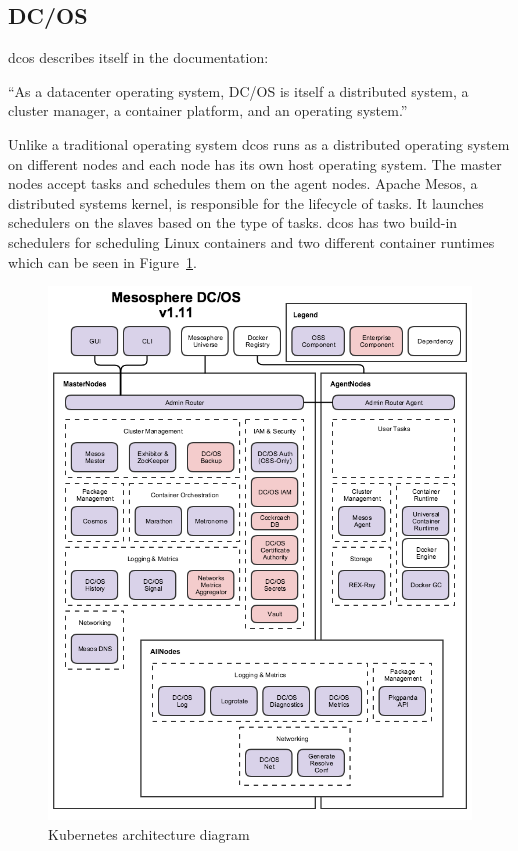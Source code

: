 \subsection{DC/OS}
\label{subsec:dcos}
\Gls{dcos} describes itself in the documentation\cite{dcos_what}: 
\begin{displayquote}
``As a datacenter operating system, DC/OS is itself a distributed system, a cluster manager, a container platform, and an operating system.''
\end{displayquote} 
Unlike a traditional operating system \gls{dcos} runs as a distributed operating system on different nodes and each node has its own host operating system. The master nodes accept tasks and schedules them on the agent nodes. Apache Mesos\cite{apache_mesos}, a distributed systems kernel, is responsible for the lifecycle of tasks. It launches schedulers on the slaves based on the type of tasks. \Gls{dcos} has two build-in schedulers for scheduling Linux containers and two different container runtimes which can be seen in Figure~\ref{fig:dcos-arch}.

\begin{figure}
    \centering
    \includegraphics[width=0.8\columnwidth]{images/dcos-arch}
    \caption{Kubernetes architecture diagram\cite{dcos_arch}}
    \label{fig:dcos-arch}
\end{figure}

